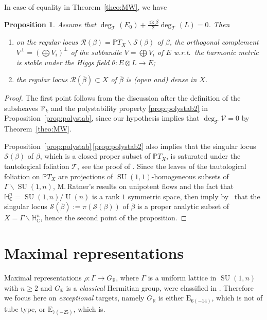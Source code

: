 \documentclass[10pt]{amsart}
\let\mathcal\mathscr
\newcommand{\citestar}[3]{\cite[#3]{#1}}
\theoremstyle{plain}
\newtheorem{prop}[theo]{Proposition}
\theoremstyle{definition}
\let\ov\overline
\DeclareMathOperator{\rk}{rk}
\DeclareMathOperator{\SU}{SU}
\DeclareMathOperator{\rU}{U}
\newcommand{\cR}{\mathcal{R}}
\newcommand{\cS}{\mathcal{S}}
\newcommand{\cT}{\mathcal{T}}
\newcommand{\cV}{\mathcal{V}}
\newcommand{\bR}{\mathbb{R}}
\newcommand{\HC}{{\mathbb{H}^n_\mathbb{C}}}
\newcommand{\PTX}{{\mathbb{P}T_X}}
\newcommand{\ovb}{\ov{\beta}}
\begin{document}
In case of equality in Theorem~\ref{theo:MW}, we have

\begin{prop}\label{prop:equal}
Assume that $\deg_\cT(E_0)+ \frac{\rk\beta}{2}\deg_\cT(L) =0$. Then
\begin{enumerate}
\item on the regular locus $\cR(\beta)=\PTX\backslash\cS(\beta)$ of $\beta$, the orthogonal complement
$V^\perp=(\bigoplus V_i)^\perp$ of the subbundle $V=\bigoplus V_i$ of $E$ w.r.t.\ the harmonic metric is
stable under the Higgs field $\theta:E\otimes L\to E$;
\item the regular locus $\cR(\ovb)\subset X$ of $\ovb$ is (open and) dense in $X$.
\end{enumerate}
\end{prop}

\begin{proof}
The first point follows from the discussion after the definition of the subsheaves $\cV_k$ and the
polystability property \eqref{prop:polystab2} in Proposition~\ref{prop:polystab}, since our hypothesis implies that
$\deg_\cT \cV=0$ by Theorem~\ref{theo:MW}.

Proposition~\ref{prop:polystab}\,\eqref{prop:polystab2} also implies that the singular locus $\cS(\beta)$ of $\beta$, which is a
closed proper subset of $\PTX$, is saturated
under the tautological foliation $\cT$, see the proof of
\citestar{KM}*{Lem.\,4.5}. Since the leaves of the tautological foliation on $\PTX$ are
projections of $\SU(1,1)$-homogeneous subsets of $\Gamma\backslash\SU(1,n)$, M.\,Ratner's
results on unipotent flows and the fact that $\HC=\SU(1,n)/\rU(n)$ is a rank $1$ symmetric
space, then imply by~\citestar{KM}*{Prop.\,3.6} that
the singular locus $\cS(\ovb):=\pi(\cS(\beta))$ of $\ovb$ is a proper analytic subset of $X=\Gamma\backslash\HC$,
hence the second point of the proposition.
\end{proof}

\section{Maximal representations}\label{sec:max}

Maximal representations $\rho:\Gamma\to G_\bR$, where $\Gamma$ is a uniform lattice in $\SU(1,n)$ with
$n\geq 2$ and $G_\bR$ is a \emph{classical} Hermitian group,
were classified in \cite{KM}. Therefore we focus here on \emph{exceptional} targets, namely $G_\bR$ is either
$\mathrm{E}_{6(-14)}$, which is not of tube type, or $\mathrm{E}_{7(-25)}$, which is.
\end{document}
